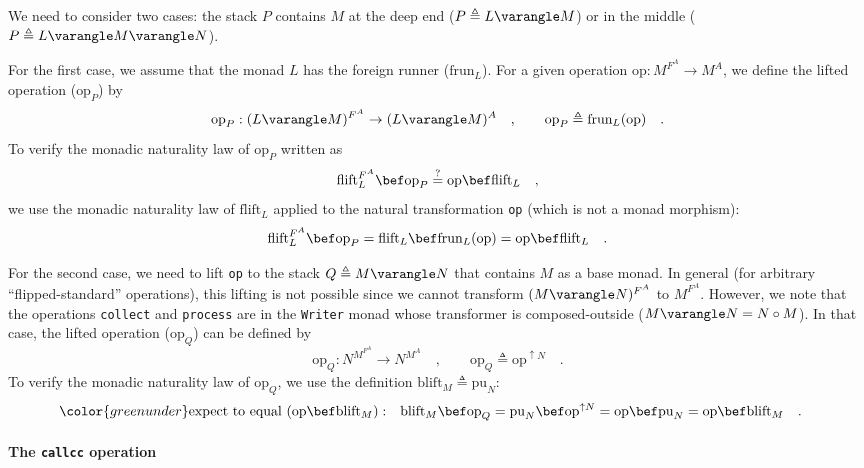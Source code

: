 We need to consider two cases: the stack $P$ contains $M$ at the
deep end ($P\triangleq L\varangle M$) or in the middle ($P\triangleq L\varangle M\varangle N$). 

For the first case, we assume that the monad $L$ has the foreign
runner ($\text{frun}_{L}$). For a given operation $\text{op}:M^{F^{A}}\rightarrow M^{A}$,
we define the lifted operation ($\text{op}_{P}$) by
\[
\text{op}_{P}:(L\varangle M)^{F^{A}}\rightarrow(L\varangle M)^{A}\quad,\quad\quad\text{op}_{P}\triangleq\text{frun}_{L}(\text{op})\quad.
\]
To verify the monadic naturality law of $\text{op}_{P}$ written as
\[
\text{flift}_{L}^{F^{A}}\bef\text{op}_{P}\overset{?}{=}\text{op}\bef\text{flift}_{L}\quad,
\]
we use the monadic naturality law of $\text{flift}_{L}$ applied to
the natural transformation \lstinline!op! (which is not a monad morphism):
\[
\text{flift}_{L}^{F^{A}}\bef\text{op}_{P}=\text{flift}_{L}\bef\text{frun}_{L}(\text{op})=\text{op}\bef\text{flift}_{L}\quad.
\]

For the second case, we need to lift \lstinline!op! to the stack
$Q\triangleq M\varangle N$ that contains $M$ as a base monad. In
general (for arbitrary \textsf{``}flipped-standard\textsf{''} operations), this lifting
is not possible since we cannot transform $(M\varangle N)^{F^{A}}$
to $M^{F^{A}}$. However, we note that the operations \lstinline!collect!
and \lstinline!process! are in the \lstinline!Writer! monad whose
transformer is composed-outside ($M\varangle N=N\circ M$). In that
case, the lifted operation ($\text{op}_{Q}$) can be defined by
\[
\text{op}_{Q}:N^{M^{F^{A}}}\rightarrow N^{M^{A}}\quad,\quad\quad\text{op}_{Q}\triangleq\text{op}^{\uparrow N}\quad.
\]
To verify the monadic naturality law of $\text{op}_{Q}$, we use the
definition $\text{blift}_{M}\triangleq\text{pu}_{N}$:
\begin{align*}
{\color{greenunder}\text{expect to equal }(\text{op}\bef\text{blift}_{M}):}\quad & \text{blift}_{M}\bef\text{op}_{Q}=\text{pu}_{N}\bef\text{op}^{\uparrow N}=\text{op}\bef\text{pu}_{N}=\text{op}\bef\text{blift}_{M}\quad.
\end{align*}


\paragraph{The \texttt{callcc} operation}

